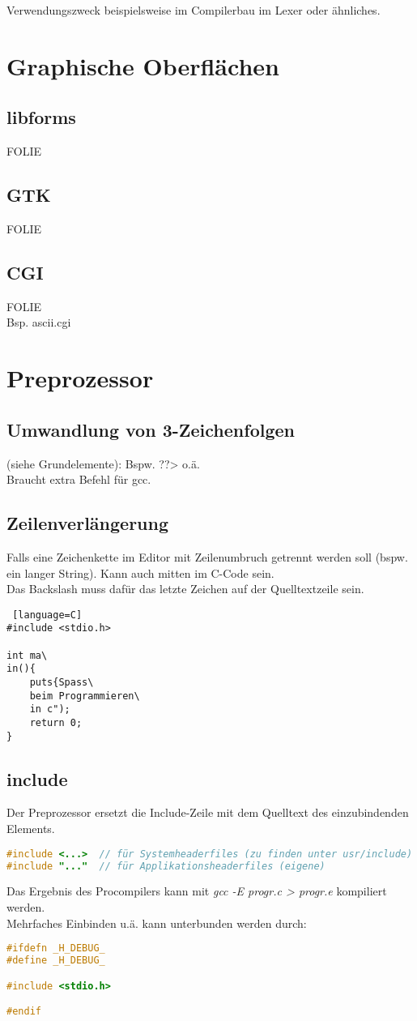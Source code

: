 Verwendungszweck beispielsweise im Compilerbau im Lexer oder ähnliches.

\section{Graphische Oberflächen}
\subsection{libforms}
FOLIE
\subsection{GTK}
FOLIE
\subsection{CGI}
FOLIE\\
Bsp. ascii.cgi

\section{Preprozessor}

\subsection{Umwandlung von 3-Zeichenfolgen}
(siehe Grundelemente): Bspw. ??> o.ä.\\
Braucht extra Befehl für gcc.

\subsection{Zeilenverlängerung}
Falls eine Zeichenkette im Editor mit Zeilenumbruch getrennt werden soll (bspw. ein langer String). Kann auch mitten im C-Code sein.\\
Das Backslash muss dafür das letzte Zeichen auf der Quelltextzeile sein.
\begin{lstlisting} [language=C]
#include <stdio.h>

int ma\
in(){
	puts{Spass\
	beim Programmieren\
	in c");
	return 0;
}
\end{lstlisting}

\subsection{include}

Der Preprozessor ersetzt die Include-Zeile mit dem Quelltext des einzubindenden Elements.
\begin{lstlisting}[language=C]
#include <...>	// für Systemheaderfiles (zu finden unter usr/include)
#include "..."	// für Applikationsheaderfiles (eigene)
\end{lstlisting}
Das Ergebnis des Procompilers kann mit \emph{gcc -E progr.c > progr.e} kompiliert werden.\\
Mehrfaches Einbinden u.ä. kann unterbunden werden durch:
\begin{lstlisting}[language=C]
#ifdefn _H_DEBUG_
#define _H_DEBUG_

#include <stdio.h>

#endif
\end{lstlisting}

